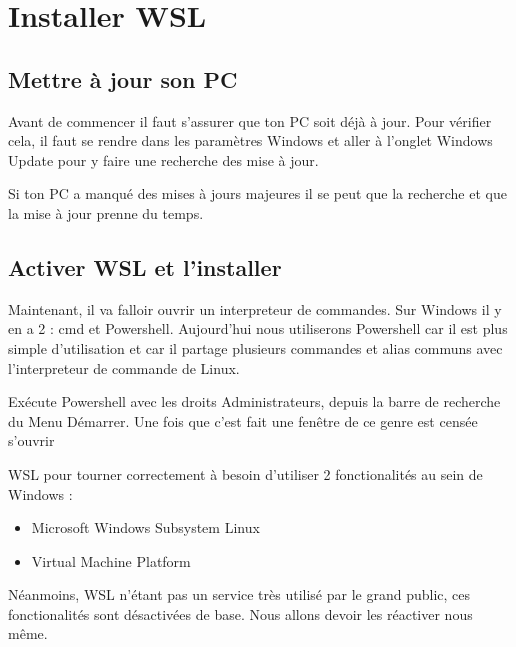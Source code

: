 \documentclass[a4paper, 12pt]{article}
\begin{document}
\section{Installer WSL}

{\comfortaa

    \subsection{Mettre à jour son PC}

    Avant de commencer il faut s'assurer que ton PC soit déjà à jour.
    Pour vérifier cela, il faut se rendre dans les paramètres Windows et aller
    à l'onglet Windows Update pour y faire une recherche des mise à jour.
    \newline \newline


    Si ton PC a manqué des mises à jours majeures il se peut que la recherche et que la
    mise à jour prenne du temps.
    \newline \newline

    
    \subsection{Activer WSL et l'installer}

    Maintenant, il va falloir ouvrir un interpreteur de commandes. Sur Windows il y en a 2 : cmd et Powershell.
    Aujourd'hui nous utiliserons Powershell car il est plus simple d'utilisation et car il partage plusieurs commandes et alias
    communs avec l'interpreteur de commande de Linux.
    \newline

    \vspace{1cm}
    Exécute Powershell avec les droits Administrateurs, depuis la barre de recherche du Menu Démarrer.
    \newline
    Une fois que c'est fait une fenêtre de ce genre est censée s'ouvrir

    WSL pour tourner correctement à besoin d'utiliser 2 fonctionalités au sein de Windows :
    \begin{itemize}
    \item Microsoft Windows Subsystem Linux
    \item Virtual Machine Platform
    \end{itemize}
    \vspace{1cm}
    Néanmoins, WSL n'étant pas un service
    très utilisé par le grand public, ces fonctionalités sont désactivées de base.
    \newline
    Nous allons devoir les réactiver nous même.
    
}
\end{document}
